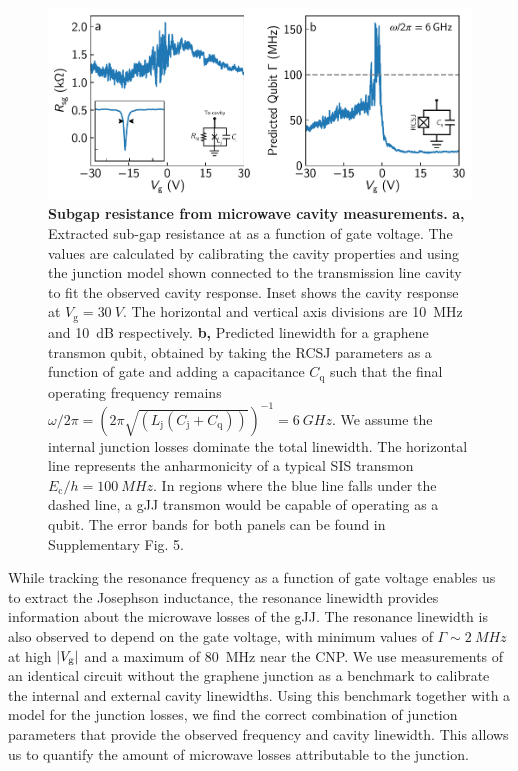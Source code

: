\begin{figure}[thb]
	\centering
	\includegraphics[width=\linewidth]{chapter-gJJ/figs/fig4_final}
	\caption[]{\textbf{Subgap resistance from microwave cavity measurements.} 
		\textbf{a,}
		Extracted sub-gap resistance at as a function of gate voltage.
		The values are calculated by calibrating the cavity properties and using the junction model shown connected to the transmission line cavity to fit the observed cavity response.
		Inset shows the cavity response at $V_\textrm{g}=\SI{30}{V}$.
		The horizontal and vertical axis divisions are \SI{10}{MHz} and \SI{10}{dB} respectively.
		\textbf{b,}
		Predicted linewidth for a graphene transmon qubit, obtained by taking the RCSJ parameters as a function of gate and adding a capacitance $C_\textrm{q}$ such that the final operating frequency remains $\omega/2\pi = \left(2\pi\sqrt{(L_\textrm{j}(C_\textrm{j}+C_\textrm{q}))}\right)^{-1} = \SI{6}{GHz}$.
		We assume the internal junction losses dominate the total linewidth.
		The horizontal line represents the anharmonicity of a typical SIS transmon $E_\textrm{c}/h=\SI{100}{MHz}$.
		In regions where the blue line falls under the dashed line, a gJJ transmon would be capable of operating as a qubit.
		The error bands for both panels can be found in Supplementary Fig. 5.
	}
	\label{fig:figure4}
\end{figure}

While tracking the resonance frequency as a function of gate voltage enables us to extract the Josephson inductance, the resonance linewidth provides information about the microwave losses of the gJJ.
The resonance linewidth is also observed to depend on the gate voltage, with minimum values of $\Gamma\sim\SI{2}{MHz}$ at high $|V_{\rm g}|$ and a maximum of \SI{80}{MHz} near the CNP.
We use measurements of an identical circuit without the graphene junction as a benchmark to calibrate the internal and external cavity linewidths.
Using this benchmark together with a model for the junction losses, we find the correct combination of junction parameters that provide the observed frequency and cavity linewidth.
This allows us to quantify the amount of microwave losses attributable to the junction.

